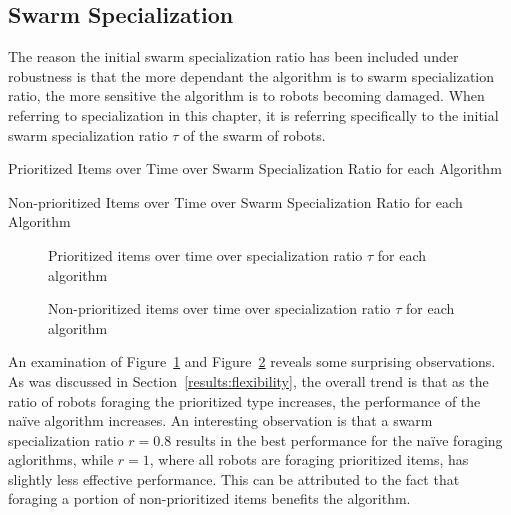 \subsection{Swarm Specialization}
\label{results:specialization}

The reason the initial swarm specialization ratio has been included under robustness is that the more dependant the algorithm is to swarm specialization ratio, the more sensitive  the algorithm is to robots becoming damaged. When referring to specialization in this chapter, it is referring specifically to the initial swarm specialization ratio $\tau$ of the swarm of robots. 

\begin{table} [h]
     \caption{Prioritized Items over Time over Swarm Specialization Ratio for each Algorithm}
     \label{specializationprioritized}
	\centering
	\footnotesize
	
\end{table}

\begin{table} [h]
     \caption{Non-prioritized Items over Time over Swarm Specialization Ratio for each Algorithm}
     \label{specializationnonprioritized}
	\centering
	\footnotesize
	
\end{table}

\begin{figure}[!htb]
\centering
\resizebox{\textwidth}{!}{}
\caption{Prioritized items over time over specialization ratio $\tau$ for each algorithm }
\label{divisiongoldplot}
\end{figure}

\begin{figure}[!htb]
\centering
\resizebox{\textwidth}{!}{}
\caption{Non-prioritized items over time over specialization ratio $\tau$ for each algorithm}
\label{divisionwasteplot}
\end{figure}

An examination of Figure~\ref{divisiongoldplot} and Figure~\ref{divisionwasteplot} reveals some surprising observations.
As was discussed in Section~\ref{results:flexibility}, the overall trend is that as the ratio of robots foraging the prioritized type increases, the performance of the na\"ive algorithm increases. An interesting observation is that a swarm specialization ratio $r=0.8$ results in the best performance for the na\"ive foraging aglorithms, while $r=1$, where all robots are foraging prioritized items, has slightly less effective performance. This can be attributed to the fact that foraging a portion of non-prioritized items benefits the algorithm.

